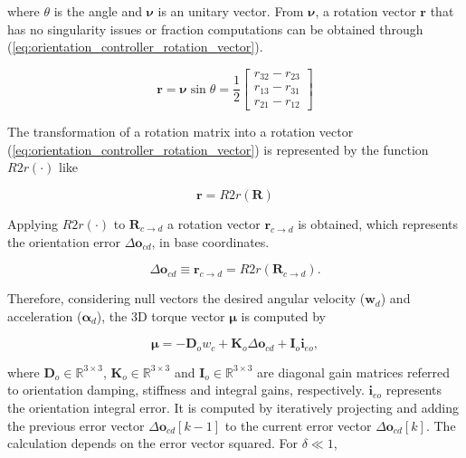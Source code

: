 where $\theta$ is the angle and $\boldsymbol{\nu}$ is an unitary vector. From $\boldsymbol{\nu}$, a rotation vector $\boldsymbol{r}$ that has no singularity issues or fraction computations can be obtained through (\ref{eq:orientation_controller_rotation_vector}).

\begin{equation}
    \label{eq:orientation_controller_rotation_vector}
    \boldsymbol{r} = \boldsymbol{\nu} \sin{\theta} = \frac{1}{2} \begin{bmatrix}
        r_{32} - r_{23}\\
        r_{13} - r_{31}\\
        r_{21} - r_{12}
        \end{bmatrix}
\end{equation}

The transformation of a rotation matrix into a rotation vector (\ref{eq:orientation_controller_rotation_vector}) is represented by the function $R2r(\cdot)$ like

\begin{equation}
    \boldsymbol{r} = R2r(\boldsymbol{R})
\end{equation}

Applying $R2r(\cdot)$ to $\boldsymbol{R}_{c\to d}$ a rotation vector $\boldsymbol{r}_{c\to d}$ is obtained,
which represents the orientation error $\Delta \boldsymbol{o}_{cd}$, in base coordinates.

\begin{equation}
    \Delta \boldsymbol{o}_{cd} \equiv \boldsymbol{r}_{c\to d} = R2r(\boldsymbol{R}_{c\to d}). 
\end{equation}

Therefore, considering null vectors the desired angular
velocity ($\boldsymbol{w}_d$) and acceleration ($\boldsymbol{\alpha}_d$), the 3D torque vector $\boldsymbol{\mu}$ is computed by

\begin{equation}
    \boldsymbol{\mu} = -\boldsymbol{D}_o w_c + \boldsymbol{K}_o \Delta \boldsymbol{o}_{cd} + \boldsymbol{I}_o \boldsymbol{i}_{eo},
\end{equation}

where $\boldsymbol{D}_o \in \mathbb{R}^{3\times3}$, $\boldsymbol{K}_o \in \mathbb{R}^{3\times3}$ and $\boldsymbol{I}_o \in \mathbb{R}^{3\times3}$ are diagonal gain matrices referred to orientation damping, stiffness and integral gains, respectively. $\boldsymbol{i}_{eo}$ represents the orientation integral error. It is computed by iteratively projecting and adding the previous error vector $\Delta \boldsymbol{o}_{cd}[k-1]$ to the current error vector $\Delta \boldsymbol{o}_{cd}[k]$. The calculation depends on the error vector squared. For $\delta \ll 1$,

